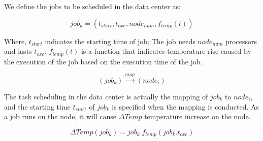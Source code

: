 We define the jobs to be scheduled in the data center as:



\begin{equation}
job_k=(t_{start}, t_{exe}, node_{num}, f_{temp}(t))
\end{equation}


Where, $t_{start}$ indicates the starting time of job; The job needs $node_{num}$ processors and lasts $t_{exe}$; $f_{temp}(t)$ is a function that indicates temperature rise caused by the execution of the job based on the execution time of the job. 



\begin{equation}
(job_k) \xrightarrow{map} (node_i) 
\end{equation}

The task scheduling in the data center is actually the mapping of $job_k$ to $node_i$, and the starting time $t_{start}$ of $job_k$ is specified when the mapping is conducted. As a job runs on the node, it will cause $\Delta Temp$ temperature increase on the node.

\begin{equation}
\Delta Temp(job_k)=job_k.f_{temp}(job_k.t_{exe})
\end{equation}

